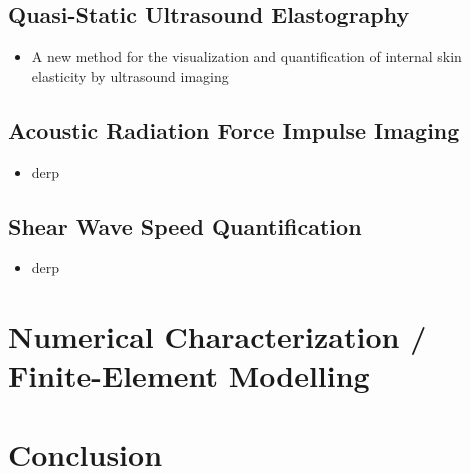 		\subsection{Quasi-Static Ultrasound Elastography}
			\begin{itemize}
				\item A new method for the visualization and quantification of internal skin elasticity by ultrasound imaging \cite{osanai11}
			\end{itemize}

		\subsection{Acoustic Radiation Force Impulse Imaging}
			\begin{itemize}
				\item derp
			\end{itemize}

		\subsection{Shear Wave Speed Quantification}
			\begin{itemize}
				\item derp
			\end{itemize}

	\section{Numerical Characterization / Finite-Element Modelling}

	\section{Conclusion}

	\cleardoublepage


	\printbibliography[heading=subbibliography]
